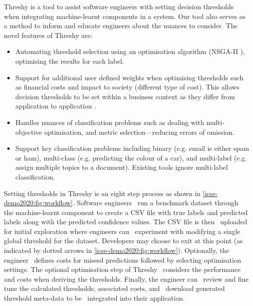 Threshy is a tool to assist software engineers with setting decision thresholds when integrating machine-learnt components in a system. Our tool also serves as a method to inform and educate engineers about the nuances to consider. The novel features of Threshy are:

\begin{itemize}
    \item Automating threshold selection using an optimisation algorithm (NSGA-II \citep{996017}), optimising the results for each label. 
    \item Support for additional user defined weights when optimising thresholds such as financial costs and impact to society (different type of cost). This allows decision thresholds to be set within a business context as they differ from application to application \citep{Drummond2006}. 
    \item Handles nuances of classification problems such as dealing with multi-objective optimisation, and metric selection---reducing errors of omission.
    \item Support key classification problems including binary (e.g. email is either spam or ham), multi-class (e.g. predicting the colour of a car), and multi-label (e.g. assign multiple topics to a document). Existing tools ignore multi-label classification.
\end{itemize}

Setting thresholds in Threshy is an eight step process as shown in \cref{icse-demo2020:fig:workflow}. Software engineers ~run a benchmark dataset through the machine-learnt component to create a CSV file with true labels and predicted labels along with the predicted confidence values. The CSV file is then ~uploaded for initial exploration where engineers can ~experiment with modifying a single global threshold for the dataset. Developers may choose to exit at this point (as indicated by dotted arrows in \cref{icse-demo2020:fig:workflow}). Optionally, the engineer ~defines costs for missed predictions followed by selecting optimisation settings. The optional optimisation step of Threshy ~considers the performance and costs when deriving the thresholds. Finally, the engineer can ~review and fine tune the calculated thresholds, associated costs, and ~download generated threshold meta-data to be ~integrated into their application.


